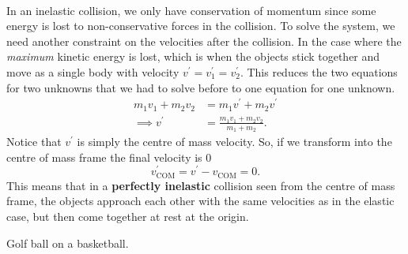 \documentclass[../classical_mechanics.tex]{subfiles}
\begin{document}
        \paragraph{}
        In an inelastic collision, we only have conservation of momentum since some energy is lost to non-conservative forces in the collision.
        To solve the system, we need another constraint on the velocities after the collision.
        In the case where the \textit{maximum} kinetic energy is lost, which is when the objects stick together and move as a single body with velocity $v^\prime=v_1^\prime=v_2^\prime$.
        This reduces the two equations for two unknowns that we had to solve before to one equation for one unknown.
        \begin{align}
            m_1v_1+m_2v_2&=m_1v^\prime+m_2v^\prime\\
            \implies v^\prime&=\frac{m_1v_1+m_2v_2}{m_1+m_2}.
        \end{align}
        Notice that $v^\prime$ is simply the centre of mass velocity.
        So, if we transform into the centre of mass frame the final velocity is 0
        \begin{equation}
            v_\text{COM}^\prime=v^\prime-v_\text{COM}=0.
        \end{equation}
        This means that in a \textbf{perfectly inelastic} collision seen from the centre of mass frame, the objects approach each other with the same velocities as in the elastic case, but then come together at rest at the origin.
        \begin{example}
            Golf ball on a basketball.
        \end{example}
\end{document}
